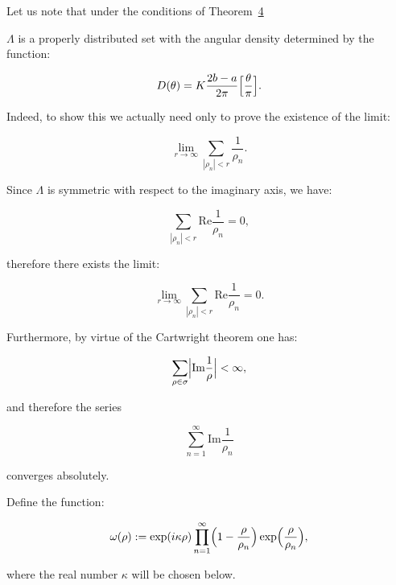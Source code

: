 Let us note that under the conditions of Theorem~\hyperlink{ign:th4}{4}

$\Lambda$ is a properly distributed set with the angular density determined by the function:

$$

D(\theta)=K\frac{2b-a}{2\pi}\Bigl[\frac{\theta}{\pi}\Bigr].

$$

Indeed, to show this we actually need only to prove the existence of the limit:

$$

\lim\limits_{r\to\infty}\sum\limits_{|\rho_n|< r} \frac{1}{\rho_n}.

$$

Since $\Lambda$ is symmetric with respect to the imaginary axis, we have:

$$

\sum\limits_{|\rho_n|< r} \mbox{Re}\frac{1}{\rho_n}=0,

$$

therefore there exists the limit:

$$

\lim\limits_{r\to\infty}\sum\limits_{|\rho_n|< r} \mbox{Re}\frac{1}{\rho_n}=0.

$$

Furthermore, by virtue of the Cartwright theorem one has:

$$

\sum\limits_{\rho\in\sigma}\Bigl|\mbox{Im}\frac{1}{\rho}\Bigr|<\infty,

$$

and therefore the series

$$

\sum\limits_{n=1}^\infty \mbox{Im}\frac{1}{\rho_n}

$$

converges absolutely.



Define the function:

\begin{equation}

\omega(\rho):=\exp(i\kappa\rho)\prod\limits_{n=1}^\infty

\Bigl(1-\frac{\rho}{\rho_n}\Bigr)\exp\Bigl(\frac{\rho}{\rho_n}\Bigr), 

\label{ig:(10)}

\end{equation}

 where the real number $\kappa$ will be chosen below. 

